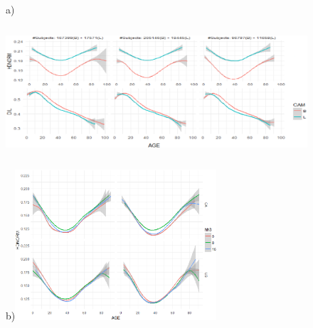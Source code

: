 \documentclass{cta-author}%
\newcommand{\cmt}[1]{}
\begin{document}
\cmt{
In the following, 
we first examine the IQ metrics and HD scores for travellers of each age group  
averaged over all factors, measured at passage.
We then 
examine the significance of age factor on the system performance in comparison to that of other factors such us kiosk location and time of the day. 
Figures \ref{fHDpassage} - \ref{fAGEvsTime} show the results.
}


\begin{figure} [!t] 
a)\includegraphics[width=0.49\linewidth,height=2.2in]{eps/1-ALL=f(AGE)-2.eps} 
b)\includegraphics[width=0.45\linewidth,height=2.2in]{eps/1M-hh3-best.eps} 

	

\end{figure}
\end{document}
